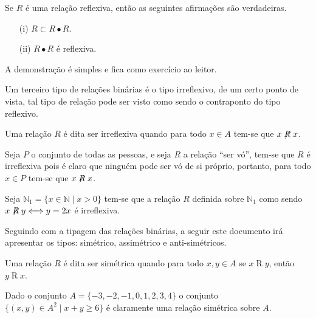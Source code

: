 \begin{teorema}
	Se $R$ é uma relação reflexiva, então as seguintes afirmações são verdadeiras.
	\begin{itemize}
		\item[(i)] $R \subset R \bullet R$.
		\item[(ii)] $R \bullet R$ é reflexiva.
	\end{itemize}
\end{teorema}

\begin{prova}
	A demonstração é simples e fica como exercício ao leitor.
\end{prova}

Um terceiro tipo de relações binárias é o tipo irreflexivo, de um certo ponto de vista, tal tipo de relação pode ser visto como sendo o contraponto do tipo reflexivo.


\begin{definicao}\label{def:RelacaoIrreflexiva}
	Uma relação $R$ é dita ser irreflexiva quando para todo $x \in A$ tem-se que $x \centernot{R} x$.
\end{definicao}

\begin{exemplo}
	Seja $P$ o conjunto de todas as pessoas, e seja $R$ a relação ``ser vó'', tem-se que $R$ é irreflexiva pois é claro que ninguém pode ser vó de si próprio, portanto, para todo $x \in P$ tem-se que $x \centernot{R} x$.
\end{exemplo}

\begin{exemplo}
	Seja $\mathbb{N}_1 = \{x \in \mathbb{N} \mid x > 0\}$ tem-se que a relação $R$ definida sobre $\mathbb{N}_1$ como sendo $x \centernot{R} y \Longleftrightarrow y = 2x$ é irreflexiva.
\end{exemplo}

Seguindo com a tipagem das relações binárias,  a seguir este documento irá apresentar os tipos: simétrico, assimétrico e anti-simétricos.

\begin{definicao}\label{def:RelacaoSimétrica}
	Uma relação $R$ é dita ser simétrica quando para todo $x, y \in A$ se $x \mathrel{R} y$, então $y \mathrel{R} x$.
\end{definicao}

\begin{exemplo}
	Dado o conjunto $A = \{-3, -2, -1, 0, 1, 2, 3, 4\}$ o conjunto $\{(x, y) \in A^2 \mid x + y \geq 6\}$ é claramente uma relação simétrica sobre $A$.
\end{exemplo}

